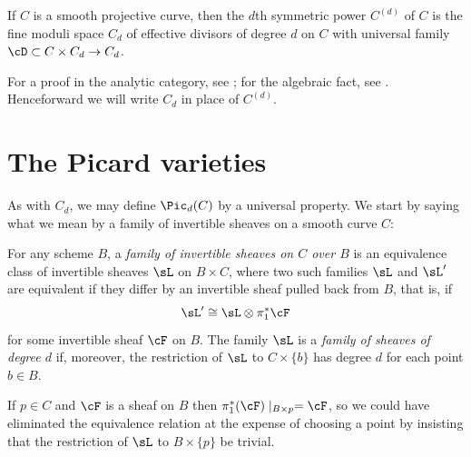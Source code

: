 \begin{theorem}
If $C$ is a smooth projective curve, then the $d$th symmetric power $C^{(d)}$ of $C$ is the fine moduli space $C_d$ of effective divisors of degree $d$ on $C$ with universal family $\cD\subset C\times C_d \to C_d$.
\end{theorem}

For a proof in the analytic category, see \cite[p. 164]{ACGH}; for the algebraic fact, see \cite[Remark 9.3.9]{Kleiman-PicardScheme}.
Henceforward we will write $C_d$ in place of $C^{(d)}$.



\section{The Picard varieties}\label{Picard section}

As with $C_d$, we may define $\Pic_d(C)$ by a universal property. We start by saying what we mean by a family of invertible sheaves on a smooth curve $C$:

\begin{definition}
 For any scheme $B$, a \emph{family of invertible sheaves on $C$ over $B$} is an equivalence class of invertible sheaves $\sL$ on $B\times C$, where two such
 families $\sL$ and $\sL'$ are equivalent if they differ by an invertible sheaf pulled back from $B$, that is, if
 $$
 \sL' \cong \sL \otimes \pi_1^*\cF
 $$
for some invertible sheaf $\cF$ on $B$.
The family $\sL$  is a \emph{family of sheaves of degree $d$} if, moreover, the restriction of $\sL$
 to $C\times \{b\}$ has degree $d$ for each point $b\in B$. 
 \end{definition}

If $p \in C$ and $\cF$ is a sheaf on $B$ then $\pi_1^*(\cF)\mid_{B\times p} = \cF$, so we could have eliminated the
equivalence relation at the expense of choosing a point by insisting that the restriction of $\sL$ to $B \times \{p\}$ be trivial.
 
 

 

